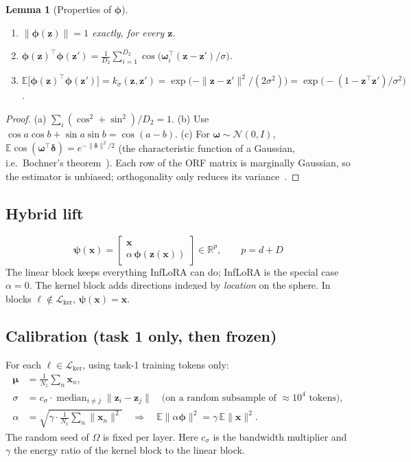 \documentclass[11pt]{article}
\theoremstyle{plain}
\newtheorem{lemma}[proposition]{Lemma}
\theoremstyle{definition}
\theoremstyle{remark}
\newcommand{\R}{\mathbb{R}}
\newcommand{\E}{\mathbb{E}}
\newcommand{\Lk}{\mathcal{L}_{\mathrm{ker}}}
\newcommand{\x}{\bm{x}}
\newcommand{\z}{\bm{z}}
\newcommand{\vphi}{\bm{\phi}}
\newcommand{\vpsi}{\bm{\psi}}
\newcommand{\vmu}{\bm{\mu}}
\begin{document}
\begin{lemma}[Properties of $\vphi$]\label{lem:rff}
\begin{enumerate}[label=(\alph*),nosep]
\item $\|\vphi(\z)\|=1$ exactly, for every $\z$.
\item $\vphi(\z)^{\top}\vphi(\z')=\frac1{D_2}\sum_{i=1}^{D_2}\cos\!\big(\bm\omega_i^{\top}(\z-\z')/\sigma\big)$.
\item $\E\big[\vphi(\z)^{\top}\vphi(\z')\big]=k_\sigma(\z,\z')=\exp\!\big(-\|\z-\z'\|^2/(2\sigma^2)\big)=\exp\!\big(-(1-\z^{\top}\z')/\sigma^2\big)$.
\end{enumerate}
\end{lemma}
\begin{proof}
(a) $\sum_i(\cos^2+\sin^2)/D_2=1$. (b) Use $\cos a\cos b+\sin a\sin b=\cos(a-b)$. (c) For $\bm\omega\sim\mathcal N(0,I)$, $\E\cos(\bm\omega^{\top}\bm\delta)=e^{-\|\bm\delta\|^2/2}$ (the characteristic function of a Gaussian, i.e.\ Bochner's theorem~\cite{rff}). Each row of the ORF matrix is marginally Gaussian, so the estimator is unbiased; orthogonality only reduces its variance~\cite{orf}.
\end{proof}

\subsection{Hybrid lift}
\begin{equation}\label{eq:psi}
\boxed{\;\vpsi(\x)=\begin{bmatrix}\x\\ \alpha\,\vphi(\z(\x))\end{bmatrix}\in\R^{p},\qquad p=d+D\;}
\end{equation}
The linear block keeps everything InfLoRA can do; InfLoRA is the special case $\alpha=0$. The kernel block adds directions indexed by \emph{location} on the sphere. In blocks $\ell\notin\Lk$, $\vpsi(\x)=\x$.

\subsection{Calibration (task 1 only, then frozen)}\label{sec:calib}
For each $\ell\in\Lk$, using task-1 training tokens only:
\begin{align}
\vmu &= \tfrac1{N_1}\textstyle\sum_n\x_n, \label{eq:mu}\\
\sigma &= c_\sigma\cdot\operatorname{median}_{i\ne j}\|\z_i-\z_j\| \quad\text{(on a random subsample of $\approx 10^4$ tokens)},\label{eq:sigma}\\
\alpha &= \sqrt{\gamma\cdot\tfrac1{N_1}\textstyle\sum_n\|\x_n\|^2}\quad\Rightarrow\quad \E\|\alpha\vphi\|^2=\gamma\,\E\|\x\|^2 .\label{eq:alpha}
\end{align}
The random seed of $\Omega$ is fixed per layer. Here $c_\sigma$ is the bandwidth multiplier and $\gamma$ the energy ratio of the kernel block to the linear block.
\end{document}
